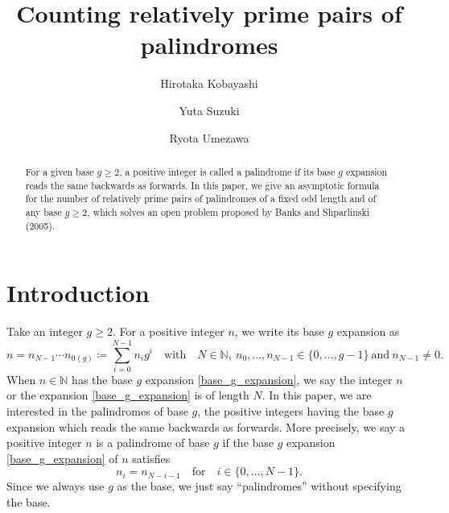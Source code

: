 \documentclass{amsart}
\theoremstyle{plain}
\theoremstyle{definition}
\begin{document}
\title[Counting relatively prime pairs of palindromes]
{Counting relatively prime pairs of palindromes}
\author[H. Kobayashi]{Hirotaka Kobayashi}
\author[Y. Suzuki]{Yuta Suzuki}
\author[R. Umezawa]{Ryota Umezawa}
\maketitle

\begin{abstract}
For a given base $g\ge2$,
a positive integer is called a palindrome
if its base $g$ expansion reads the same backwards as forwards.
In this paper, we give an asymptotic formula
for the number of relatively prime pairs
of palindromes of a fixed odd length and of any base $g\ge2$,
which solves an open problem proposed by Banks and Shparlinski (2005).
\end{abstract}

\section{Introduction}
\label{sec:intro}
Take an integer $g\ge2$.
For a positive integer $n$,
we write its base $g$ expansion as
\begin{equation}
\label{base_g_expansion}
n
=
n_{N-1}\cdots n_{0}{}_{(g)}
\coloneqq
\sum_{i=0}^{N-1}n_{i}g^{i}
\quad\text{with}\quad
N\in\mathbb{N},\ 
n_{0},\ldots,n_{N-1}\in\{0,\ldots,g-1\}
\ \text{and}\ 
n_{N-1}\neq0.
\end{equation}
When $n\in\mathbb{N}$
has the base $g$ expansion \cref{base_g_expansion},
we say the integer $n$ or the expansion \cref{base_g_expansion} is of length $N$.
In this paper, we are interested in the palindromes of base $g$,
the positive integers having the base $g$ expansion
which reads the same backwards as forwards.
More precisely, we say a positive integer $n$ is a palindrome of base $g$
if the base $g$ expansion \cref{base_g_expansion} of $n$ satisfies
\begin{equation}
\label{def:palindrome:eq}
n_{i}=n_{N-i-1}
\quad\text{for}\quad
i\in\{0,\ldots,N-1\}.
\end{equation}
Since we always use $g$ as the base,
we just say ``palindromes'' without specifying the base.
\end{document}
